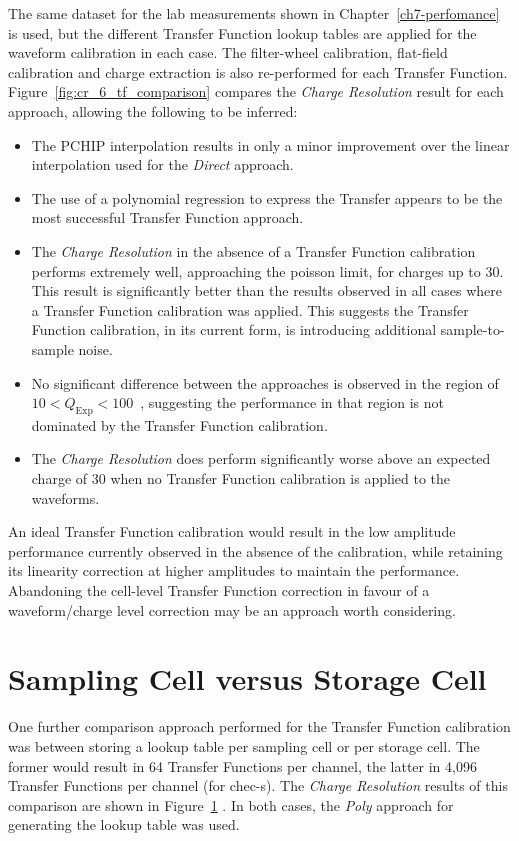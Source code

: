 The same dataset for the lab measurements shown in Chapter~\ref{ch7-perfomance} is used, but the different Transfer Function lookup tables are applied for the waveform calibration in each case. The filter-wheel calibration, flat-field calibration and charge extraction is also re-performed for each Transfer Function. Figure~\ref{fig:cr_6_tf_comparison} compares the \textit{Charge Resolution} result for each approach, allowing the following to be inferred:
\begin{itemize}
	\item The PCHIP interpolation results in only a minor improvement over the linear interpolation used for the \textit{Direct} approach.
	\item The use of a polynomial regression to express the Transfer appears to be the most successful Transfer Function approach.
	\item The \textit{Charge Resolution} in the absence of a Transfer Function calibration performs extremely well, approaching the poisson limit, for charges up to \SI{30}{\pe}. This result is significantly better than the results observed in all cases where a Transfer Function calibration was applied. This suggests the Transfer Function calibration, in its current form, is introducing additional sample-to-sample noise.
	\item No significant difference between the approaches is observed in the region of $10 < Q_\text{Exp} < 100$~\si{\pe}, suggesting the performance in that region is not dominated by the Transfer Function calibration.
	\item The \textit{Charge Resolution} does perform significantly worse above an expected charge of \SI{30}{\pe} when no Transfer Function calibration is applied to the waveforms.
\end{itemize}
An ideal Transfer Function calibration would result in the low amplitude performance currently observed in the absence of the calibration, while retaining its linearity correction at higher amplitudes to maintain the performance. Abandoning the cell-level Transfer Function correction in favour of a waveform/charge level correction may be an approach worth considering.

\section{Sampling Cell versus Storage Cell}

One further comparison approach performed for the Transfer Function calibration was between storing a lookup table per sampling cell or per storage cell. The former would result in 64 Transfer Functions per channel, the latter in 4,096 Transfer Functions per channel (for \gls{chec-s}). The \textit{Charge Resolution} results of this comparison are shown in Figure~\ref{} . In both cases, the \textit{Poly} approach for generating the lookup table was used.

